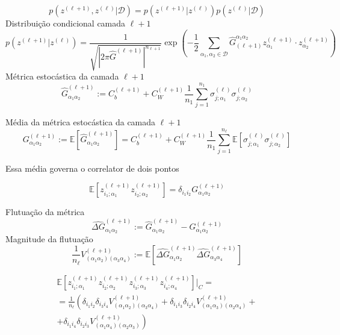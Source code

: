 \documentclass{beamer}
\newcommand{\EE}{\mathbb{E}}
\newcommand{\Dcal}{\mathcal{D}}
\def\mi#1{{\alpha_{#1}}}
\def\eell{{(\ell)}}
\def\eellum{{(\ell+1)}}
\def\Gchapp#1{\widehat{G}^{(#1)}}
\newcommand{\Gchapeu}[3]{{\Gchapp{#1}_{\mi{#2}\mi{#3}}}}
\newcommand{\Gchapeuinv}[3]{\widehat{G}_{(#1)}^{\mi{#2}\mi{#3}}}
\newcommand{\Gnormal}[3]{{G^{(#1)}_{\mi{#2}\mi{#3}}}}
\newcommand{\Gflutu}[3]{{\widehat{\Delta G}^{(#1)}_{\mi{#2}\mi{#3}}}}
\newcommand{\Vertice}[5]{V^{(#1)}_{(\mi#2\mi#3)(\mi#4\mi#5)}}
\newcommand{\zia}[2]{z_{i_{#1};\mi{#2}}}
\begin{document}
\begin{frame}
	\begin{equation*}\tag{4.67}
		p\left(z^\eellum,z^\eell\Big|\Dcal\right) = p\left(z^\eellum\Big| z^\eell\right)p\left(z^\eell\Big| \Dcal\right)
	\end{equation*}
	Distribuição condicional camada $\ell+1$
{\footnotesize
	\begin{equation*}\tag{4.69}
			p\left(z^\eellum\Big| z^\eell\right) = \frac{1}{\sqrt{\left|2\pi \hat{G}^\eellum\right|^{n_{\ell+1}}}}
			\exp\left(-\frac{1}{2} \sum_{\mi1,\mi2\in\Dcal} \Gchapeuinv{\ell+1}12 z^\eellum_{\mi1}\cdot z^\eellum_{\mi2} \right)
		\end{equation*}
}
Métrica estocástica da camada $\ell+1$
	\begin{equation*}\tag{4.70}
		\Gchapeu{\ell+1}12 := C_b^\eellum + C_W^\eellum\frac{1}{n_1}\sum_{j=1}^{n_1} \sigma_{j;\mi1}^\eell\sigma_{j;\mi2}^\eell
	\end{equation*}
\end{frame}

\begin{frame}
	Média da métrica estocástica da camada $\ell+1$
	\begin{equation*}\tag{4.72}
		\Gnormal{\ell+1}12 := \EE\left[\Gchapeu{\ell+1}12 \right] =  C_b^\eellum + C_W^\eellum\frac{1}{n_1}\sum_{j=1}^{n_\ell} \EE\left[\sigma_{j;\mi1}^\eell\sigma_{j;\mi2}^\eell\right]
	\end{equation*}

	Essa média governa o correlator de dois pontos

	\begin{equation*}\tag{4.73}
		\EE\left[\zia11^\eellum \zia22^\eellum\right] = \delta_{i_1i_2}\Gnormal{\ell+1}12 
	\end{equation*}
\end{frame}

\begin{frame}
	
	Flutuação da métrica 
	\begin{equation*}\tag{4.74}
		\Gflutu{\ell+1}12 := \Gchapeu{\ell+1}12 - \Gnormal{\ell+1}12
	\end{equation*}
	Magnitude da flutuação
	\begin{equation*}\tag{4.76}
		\frac{1}{n_\ell}\Vertice{\ell+1}1234 := \EE\left[\Gflutu{\ell+1}12 \Gflutu{\ell+1}34 \right]
	\end{equation*}
\end{frame}

\begin{frame}
	\begin{multline*}
		\EE\left[\zia11^\eellum \zia22^\eellum \zia33^\eellum \zia44^\eellum\right]\Big|_{C} =\\= \frac{1}{n_\ell}\left( 
			\delta_{i_1i_2}\delta_{i_3i_4} \Vertice{\ell+1}1234 +
			\delta_{i_1i_3}\delta_{i_2i_4} \Vertice{\ell+1}1324 +\right.\\+\left.
			\delta_{i_1i_4}\delta_{i_2i_3} \Vertice{\ell+1}1423 
		\right)\tag{4.77}
	\end{multline*}
\end{frame}
\end{document}
